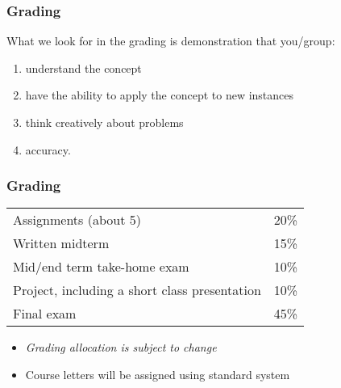 \begin{frame}\frametitle{Grading}
	What we look for in the grading is demonstration that you/group:
	\begin{enumerate}
		\item	understand the concept
		\item	have the ability to apply the concept to new instances
		\item	think creatively about problems
		\item	accuracy.
	\end{enumerate}
\end{frame}

\begin{frame}\frametitle{Grading}
	\begin{tabular}{ll}\\
		Assignments (about 5)       	& 20\% \\
	    Written midterm        			& 15\% \\
	    Mid/end term take-home exam		& 10\% \\
	    Project, including a short class presentation& 10\% \\
	    Final exam 						& 45\% \\
	\end{tabular}
	
	\vspace{12pt}
	\vspace{12pt}
	
	\begin{itemize}
		\item	\emph{Grading allocation is subject to change}
		\item	Course letters will be assigned using standard system
	\end{itemize}
\end{frame}


